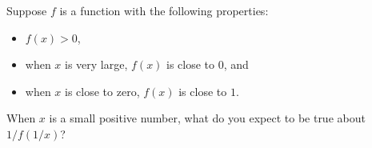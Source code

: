 \documentclass{ximera}
\begin{document}
\begin{problem}
  Suppose $f$ is a function with the following properties:
  \begin{itemize}
  \item $f(x) > 0$,
  \item when $x$ is very large, $f(x)$ is close to $0$, and
  \item when $x$ is close to zero, $f(x)$ is close to $1$.
  \end{itemize}
  When $x$ is a small positive number, what do you expect to be true about $1/f(1/x)$?
  \begin{multipleChoice}
  \end{multipleChoice}
\end{problem}
\end{document}
